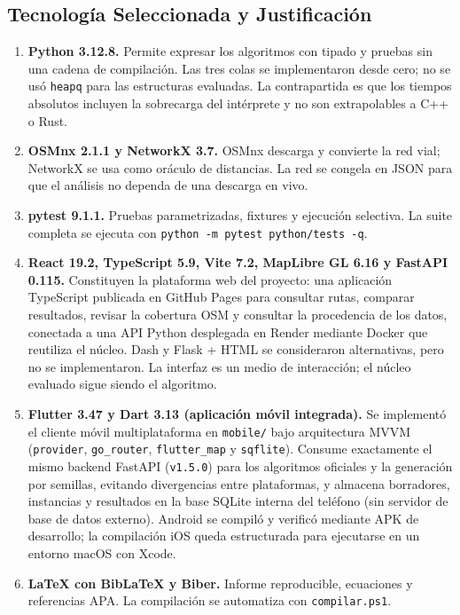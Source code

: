 \subsection{Tecnología Seleccionada y Justificación}
\begin{enumerate}
    \item \textbf{Python 3.12.8.} Permite expresar los algoritmos con tipado y pruebas sin una cadena de compilación. Las tres colas se implementaron desde cero; no se usó \texttt{heapq} para las estructuras evaluadas. La contrapartida es que los tiempos absolutos incluyen la sobrecarga del intérprete y no son extrapolables a C++ o Rust.
    \item \textbf{OSMnx 2.1.1 y NetworkX 3.7.} OSMnx descarga y convierte la red vial; NetworkX se usa como oráculo de distancias. La red se congela en JSON para que el análisis no dependa de una descarga en vivo.
    \item \textbf{pytest 9.1.1.} Pruebas parametrizadas, fixtures y ejecución selectiva. La suite completa se ejecuta con \texttt{python -m pytest python/tests -q}.
    \item \textbf{React 19.2, TypeScript 5.9, Vite 7.2, MapLibre GL 6.16 y FastAPI 0.115.} Constituyen la plataforma web del proyecto: una aplicación TypeScript publicada en GitHub Pages para consultar rutas, comparar resultados, revisar la cobertura OSM y consultar la procedencia de los datos, conectada a una API Python desplegada en Render mediante Docker que reutiliza el núcleo. Dash y Flask + HTML se consideraron alternativas, pero no se implementaron. La interfaz es un medio de interacción; el núcleo evaluado sigue siendo el algoritmo.
    \item \textbf{Flutter 3.47 y Dart 3.13 (aplicación móvil integrada).} Se implementó el cliente móvil multiplataforma en \texttt{mobile/} bajo arquitectura MVVM (\texttt{provider}, \texttt{go\_router}, \texttt{flutter\_map} y \texttt{sqflite}). Consume exactamente el mismo backend FastAPI (\texttt{v1.5.0}) para los algoritmos oficiales y la generación por semillas, evitando divergencias entre plataformas, y almacena borradores, instancias y resultados en la base SQLite interna del teléfono (sin servidor de base de datos externo). Android se compiló y verificó mediante APK de desarrollo; la compilación iOS queda estructurada para ejecutarse en un entorno macOS con Xcode.
    \item \textbf{LaTeX con BibLaTeX y Biber.} Informe reproducible, ecuaciones y referencias APA. La compilación se automatiza con \texttt{compilar.ps1}.

\end{enumerate}
